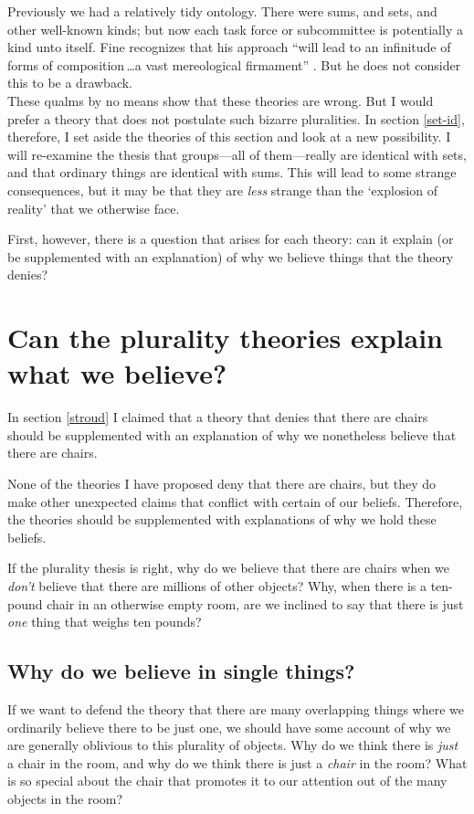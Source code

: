 \documentclass[11pt]{article}
\begin{document}
\begin{spacing}{1.5}
Previously we had a relatively tidy ontology.  There were sums, and
sets, and other well-known kinds; but now each task force or
subcommittee is potentially a kind unto itself.  Fine recognizes that
his approach ``will lead to an infinitude of forms of
composition\,\ldots a vast mereological firmament''
\citeyearpar[576]{fine2010}.  But he does not consider this to be a
drawback.\\

These qualms by no means show that these theories are wrong.  But I
would prefer a theory that does not postulate such bizarre
pluralities.  In section \ref{set-id}, therefore, I set aside the
theories of this section and look at a new possibility.  I will
re-examine the thesis that groups---all of them---really are identical
with sets, and that ordinary things are identical with sums.  This
will lead to some strange consequences, but it may be that they are
{\em less} strange than the `explosion of reality' that we otherwise
face.

First, however, there is a question that arises for each theory: can
it explain (or be supplemented with an explanation) of why we believe
things that the theory denies?

\section{Can the plurality theories explain what we believe?}
\label{explain-p}
In section \ref{stroud} I claimed that a theory that denies that there
are chairs should be supplemented with an explanation of why we
nonetheless believe that there are chairs.

None of the theories I have proposed deny that there are chairs, but
they do make other unexpected claims that conflict with certain of our
beliefs.  Therefore, the theories should be supplemented with
explanations of why we hold these beliefs.

If the plurality thesis is right, why do we believe that there are
chairs when we {\em don't} believe that there are millions of other
objects?  Why, when there is a ten-pound chair in an otherwise empty
room, are we inclined to say that there is just {\em one} thing that
weighs ten pounds?

\subsection{Why do we believe in single things?}
\label{exp-single}
If we want to defend the theory that there are many overlapping things
where we ordinarily believe there to be just one, we should have some
account of why we are generally oblivious to this plurality of
objects.  Why do we think there is {\em just} a chair in the room, and
why do we think there is just a {\em chair} in the room?  What is so
special about the chair that promotes it to our attention out of the
many objects in the room?


\end{spacing}
\end{document}
